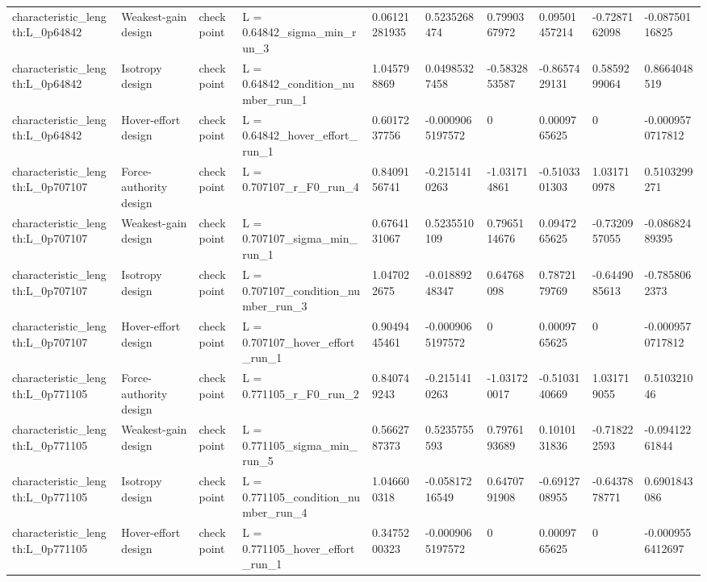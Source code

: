 \begin{tabular}{@{}llllllllll@{}}
characteristic\_length:L\_0p64842 & Weakest-gain design & checkpoint & L = 0.64842\_sigma\_min\_run\_3 & 0.06121281935 & 0.5235268474 & 0.7990367972 & 0.09501457214 & -0.7287162098 & -0.08750116825 \\
characteristic\_length:L\_0p64842 & Isotropy design & checkpoint & L = 0.64842\_condition\_number\_run\_1 & 1.045798869 & 0.04985327458 & -0.5832853587 & -0.8657429131 & 0.5859299064 & 0.8664048519 \\
characteristic\_length:L\_0p64842 & Hover-effort design & checkpoint & L = 0.64842\_hover\_effort\_run\_1 & 0.6017237756 & -0.0009065197572 & 0 & 0.0009765625 & 0 & -0.0009570717812 \\
characteristic\_length:L\_0p707107 & Force-authority design & checkpoint & L = 0.707107\_r\_F0\_run\_4 & 0.8409156741 & -0.2151410263 & -1.031714861 & -0.5103301303 & 1.031710978 & 0.5103299271 \\
characteristic\_length:L\_0p707107 & Weakest-gain design & checkpoint & L = 0.707107\_sigma\_min\_run\_1 & 0.6764131067 & 0.5235510109 & 0.7965114676 & 0.0947265625 & -0.7320957055 & -0.08682489395 \\
characteristic\_length:L\_0p707107 & Isotropy design & checkpoint & L = 0.707107\_condition\_number\_run\_3 & 1.047022675 & -0.01889248347 & 0.64768098 & 0.7872179769 & -0.6449085613 & -0.7858062373 \\
characteristic\_length:L\_0p707107 & Hover-effort design & checkpoint & L = 0.707107\_hover\_effort\_run\_1 & 0.9049445461 & -0.0009065197572 & 0 & 0.0009765625 & 0 & -0.0009570717812 \\
characteristic\_length:L\_0p771105 & Force-authority design & checkpoint & L = 0.771105\_r\_F0\_run\_2 & 0.840749243 & -0.2151410263 & -1.031720017 & -0.5103140669 & 1.031719055 & 0.510321046 \\
characteristic\_length:L\_0p771105 & Weakest-gain design & checkpoint & L = 0.771105\_sigma\_min\_run\_5 & 0.5662787373 & 0.5235755593 & 0.7976193689 & 0.1010131836 & -0.718222593 & -0.09412261844 \\
characteristic\_length:L\_0p771105 & Isotropy design & checkpoint & L = 0.771105\_condition\_number\_run\_4 & 1.046600318 & -0.05817216549 & 0.6470791908 & -0.6912708955 & -0.6437878771 & 0.6901843086 \\
characteristic\_length:L\_0p771105 & Hover-effort design & checkpoint & L = 0.771105\_hover\_effort\_run\_1 & 0.3475200323 & -0.0009065197572 & 0 & 0.0009765625 & 0 & -0.0009556412697 \\

\end{tabular}
